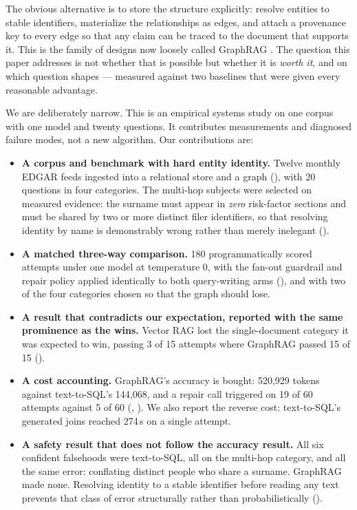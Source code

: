 The obvious alternative is to store the structure explicitly: resolve entities to
stable identifiers, materialize the relationships as edges, and attach a
provenance key to every edge so that any claim can be traced to the document that
supports it. This is the family of designs now loosely called GraphRAG
\citep{edge2024graphrag,peng2024graphragsurvey}. The question this paper addresses
is not whether that is possible but whether it is \emph{worth it}, and on which
question shapes --- measured against two baselines that were given every
reasonable advantage.

We are deliberately narrow. This is an empirical systems study on one corpus with
one model and twenty questions. It contributes measurements and diagnosed failure
modes, not a new algorithm. Our contributions are:

\begin{itemize}
  \item \textbf{A corpus and benchmark with hard entity identity.} Twelve monthly
        EDGAR feeds ingested into a relational store and a graph
        (), with 20 questions in four categories. The multi-hop
        subjects were selected on measured evidence: the surname must appear in
        \emph{zero} risk-factor sections and must be shared by two or more
        distinct filer identifiers, so that resolving identity by name is
        demonstrably wrong rather than merely inelegant
        ().
  \item \textbf{A matched three-way comparison.} 180 programmatically scored
        attempts under one model at temperature 0, with the fan-out guardrail and
        repair policy applied identically to both query-writing arms
        (), and with two of the four categories chosen so that the
        graph should lose.
  \item \textbf{A result that contradicts our expectation, reported with the
        same prominence as the wins.} Vector RAG lost the single-document
        category it was expected to win, passing 3 of 15 attempts where GraphRAG
        passed 15 of 15 ().
  \item \textbf{A cost accounting.} GraphRAG's accuracy is bought:
        520{,}929 tokens against text-to-SQL's
        144{,}068, and a repair call triggered on
        19 of 60 attempts against 5 of 60
        (, ). We also report the reverse cost:
        text-to-SQL's generated joins reached 274\,s on a
        single attempt.
  \item \textbf{A safety result that does not follow the accuracy result.}
        All six confident falsehoods were text-to-SQL, all on the multi-hop
        category, and all the same error: conflating distinct people who share a
        surname. GraphRAG made none. Resolving identity to a stable identifier
        before reading any text prevents that class of error structurally rather
        than probabilistically ().
\end{itemize}

